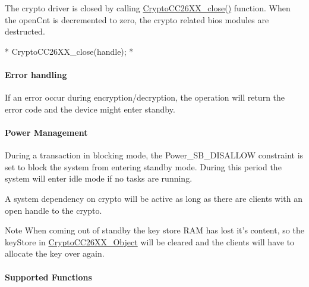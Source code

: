 The crypto driver is closed by calling \hyperlink{_crypto_c_c26_x_x_8h_aa2ece822f0fd8f6dbd3f50500b03bea4}{Crypto\-C\-C26\-X\-X\-\_\-close()} function. When the open\-Cnt is decremented to zero, the crypto related bios modules are destructed. 
\begin{DoxyCode}
*  CryptoCC26XX_close(handle);
*  
\end{DoxyCode}


\paragraph*{Error handling}

If an error occur during encryption/decryption, the operation will return the error code and the device might enter standby.

\paragraph*{Power Management}

During a transaction in blocking mode, the Power\-\_\-\-S\-B\-\_\-\-D\-I\-S\-A\-L\-L\-O\-W constraint is set to block the system from entering standby mode. During this period the system will enter idle mode if no tasks are running.

A system dependency on crypto will be active as long as there are clients with an open handle to the crypto.

\begin{DoxyNote}{Note}
When coming out of standby the key store R\-A\-M has lost it's content, so the key\-Store in \hyperlink{struct_crypto_c_c26_x_x___object}{Crypto\-C\-C26\-X\-X\-\_\-\-Object} will be cleared and the clients will have to allocate the key over again.
\end{DoxyNote}
\paragraph*{Supported Functions}

